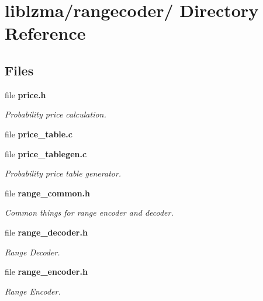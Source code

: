 \section{liblzma/rangecoder/ Directory Reference}
\label{dir_853e2fd5c4ef498883c367265d805e85}
\subsection*{Files}
\begin{DoxyCompactItemize}
\item 
file {\bf price.\-h}
\begin{DoxyCompactList}\small\item\em Probability price calculation. \end{DoxyCompactList}\item 
file {\bfseries price\-\_\-table.\-c}
\item 
file {\bf price\-\_\-tablegen.\-c}
\begin{DoxyCompactList}\small\item\em Probability price table generator. \end{DoxyCompactList}\item 
file {\bf range\-\_\-common.\-h}
\begin{DoxyCompactList}\small\item\em Common things for range encoder and decoder. \end{DoxyCompactList}\item 
file {\bf range\-\_\-decoder.\-h}
\begin{DoxyCompactList}\small\item\em Range Decoder. \end{DoxyCompactList}\item 
file {\bf range\-\_\-encoder.\-h}
\begin{DoxyCompactList}\small\item\em Range Encoder. \end{DoxyCompactList}\end{DoxyCompactItemize}
